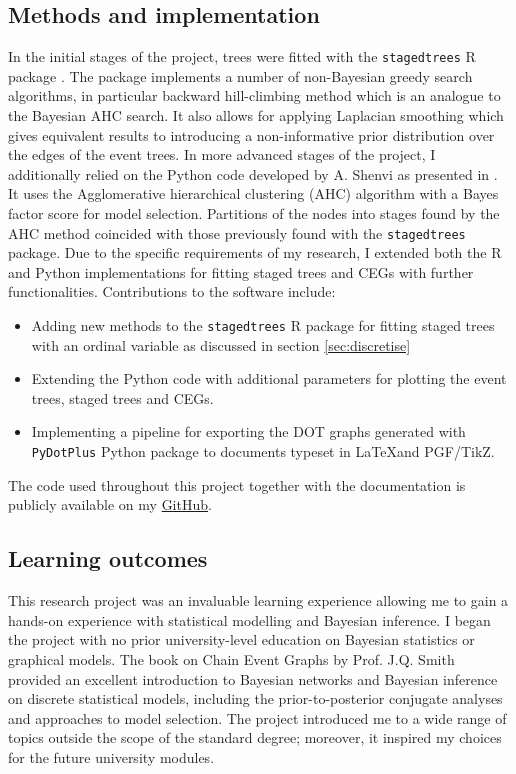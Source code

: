 \documentclass[runningheads]{llncs}
\begin{document}
\subsection*{Methods and implementation}
In the initial stages of the project, trees were fitted with the \texttt{stagedtrees} R package \cite{stagedtrees}. The package implements a number of non-Bayesian greedy search algorithms, in particular backward hill-climbing method which is an analogue to the Bayesian AHC search. It also allows for applying Laplacian smoothing which gives equivalent results to introducing a non-informative prior distribution over the edges of the event trees. In more advanced stages of the project, I additionally relied on the Python code developed by A. Shenvi as presented in \cite{shenvi2020constructing}. It uses the Agglomerative hierarchical clustering (AHC) algorithm with a Bayes factor score for model selection. Partitions of the nodes into stages found by the AHC method coincided with those previously found with the \texttt{stagedtrees} package. Due to the specific requirements of my research, I extended both the R and Python implementations for fitting staged trees and CEGs with further functionalities. Contributions to the software include:
\begin{itemize}[topsep=0pt]
    \item Adding new methods to the \texttt{stagedtrees} R package for fitting staged trees with an ordinal variable as discussed in section \ref{sec:discretise}
    \item Extending the Python code with additional parameters for plotting the event trees, staged trees and CEGs.
    \item Implementing a pipeline for exporting the DOT graphs generated with \\ \texttt{PyDotPlus} Python package to documents typeset in \LaTeX and PGF/TikZ.
\end{itemize}
The code used throughout this project together with the documentation is publicly available on my \href{https://github.com/Kaasiak/chain-event-graphs}{GitHub}.

\subsection*{Learning outcomes}
This research project was an invaluable learning experience allowing me to gain a hands-on experience with statistical modelling and Bayesian inference. I began the project with no prior university-level education on Bayesian statistics or graphical models. The book on Chain Event Graphs by Prof. J.Q. Smith \cite{smith2017cegs} provided an excellent introduction to Bayesian networks and Bayesian inference on discrete statistical models, including the prior-to-posterior conjugate analyses and approaches to model selection. The project introduced me to a wide range of topics outside the scope of the standard degree; moreover, it inspired my choices for the future university modules. 
\vspace{5ex}
\end{document}
